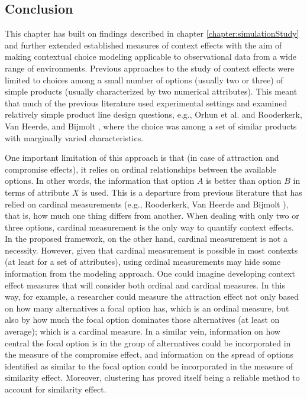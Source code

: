 \documentclass[a4paper,12pt]{article}
\newcommand{\citeyearonly}[1]{\citeyearpar{#1}}
\begin{document}
\clearpage

\subsection{Conclusion}

This chapter has built on findings described in chapter \ref{chapter:simulationStudy} and further extended established measures of context effects with the aim of making contextual choice modeling applicable to observational data from a wide range of environments. Previous approaches to the study of context effects were limited to choices among a small number of options (usually two or three) of simple products (usually characterized by two numerical attributes). This meant that much of the previous literature used experimental settings and examined relatively simple product line design questions, e.g., Orhun et al. \citeyearonly{orhun09} and Rooderkerk, Van Heerde, and Bijmolt \citeyearonly{roodrkerkEtAl11}, where the choice was among a set of similar products with marginally varied characteristics. 

One important limitation of this approach is that (in case of attraction and compromise effects), it relies on ordinal relationships between the available options. In other words, the information that option $A$ is better than option $B$ in terms of attribute $X$ is used. This is a departure from previous literature that has relied on cardinal measurements (e.g., Rooderkerk, Van Heerde and Bijmolt \citeyearonly{roodrkerkEtAl11}), that is, how much one thing differs from another. When dealing with only two or three options, cardinal measurement is the only way to quantify context effects. In the proposed framework, on the other hand, cardinal measurement is not a necessity. However, given that cardinal measurement is possible in most contexts (at least for a set of attributes), using ordinal measurements may hide some information from the modeling approach. One could imagine developing context effect measures that will consider both ordinal and cardinal measures. In this way, for example, a researcher could measure the attraction effect not only based on how many alternatives a focal option has, which is an ordinal measure, but also by how much the focal option dominates those alternatives (at least on average); which is a cardinal measure. In a similar vein, information on how central the focal option is in the group of alternatives could be incorporated in the measure of the compromise effect, and information on the spread of options identified as similar to the focal option could be incorporated in the measure of similarity effect.  Moreover, clustering has proved itself being a reliable method to account for similarity effect.
\end{document}
